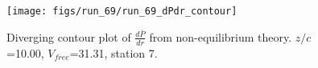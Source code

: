 \begin{figure}[H]
\centering
\texttt{[image: figs/run\_69/run\_69\_dPdr\_contour]}
\caption{Diverging contour plot of $\frac{d\bar{P}}{dr}$ from non-equilibrium theory. $z/c$=10.00, $V_{free}$=31.31, station 7.}
\label{fig:run_69_dPdr_contour}
\end{figure}


